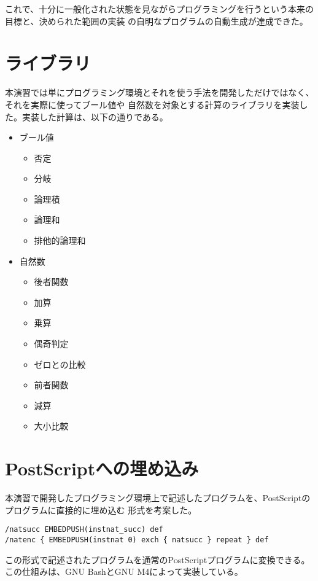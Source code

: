 \documentclass[a4paper, 10pt, twocolumn, titlepage]{ujarticle}
\renewcommand{\{}{\symbol{"7B}}
\renewcommand{\}}{\symbol{"7D}}
\begin{document}
これで、十分に一般化された状態を見ながらプログラミングを行うという本来の目標と、決められた範囲の実装
の自明なプログラムの自動生成が達成できた。

\section{ライブラリ}

本演習では単にプログラミング環境とそれを使う手法を開発しただけではなく、それを実際に使ってブール値や
自然数を対象とする計算のライブラリを実装した。実装した計算は、以下の通りである。

\begin{itemize}
 \item ブール値
       \begin{itemize}
	\item 否定
	\item 分岐
	\item 論理積
	\item 論理和
	\item 排他的論理和
       \end{itemize}
 \item 自然数
       \begin{itemize}
	\item 後者関数
	\item 加算
	\item 乗算
	\item 偶奇判定
	\item ゼロとの比較
	\item 前者関数
	\item 減算
	\item 大小比較
       \end{itemize}
\end{itemize}

\section{PostScriptへの埋め込み}

本演習で開発したプログラミング環境上で記述したプログラムを、PostScriptのプログラムに直接的に埋め込む
形式を考案した。

\begin{lstlisting}[style=plain]
/natsucc EMBEDPUSH(instnat_succ) def
/natenc { EMBEDPUSH(instnat 0) exch { natsucc } repeat } def
\end{lstlisting}

この形式で記述されたプログラムを通常のPostScriptプログラムに変換できる。この仕組みは、GNU BashとGNU
M4によって実装している。
\end{document}
